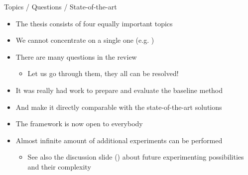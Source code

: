 \documentclass[xcolor=dvipsnames]{beamer}
\begin{document}
\begin{frame}{Topics / Questions / State-of-the-art}
\begin{itemize}
	\item The thesis consists of \alert{four equally important topics}
	\item We cannot concentrate on a single one (e.g. )
	\bigskip
	\item There are many questions in the review
	\begin{itemize}
		\item Let us go through them, \alert{they all can be resolved!}
	\end{itemize}
	\bigskip
	\item It was really had work to prepare and evaluate the baseline method
	\item And make it \alert{directly comparable} with the state-of-the-art solutions
	\item The framework is now open to everybody
	\item Almost infinite amount of additional experiments can be performed
	\begin{itemize}
		\item See also the discussion slide (\pageref{future_experiments}) about future experimenting possibilities and their \alert{complexity}
	\end{itemize}
\end{itemize}
\end{frame}
\end{document}
